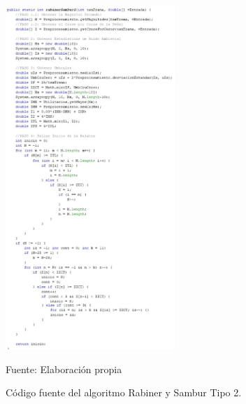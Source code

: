 \begin{enumerate}
\begin{figure}[H]
\captionsetup{justification=centering}
\begin{center}
\includegraphics[width=0.57\textwidth]{Imagenes/Cap3/image018}
\end{center}
\begin{center}
\vskip -0.5cm
\caption{\small{Código fuente del algoritmo Rabiner y Sambur Tipo 2.}}
\label{fig:figura3.18}
{\small{Fuente: Elaboración propia}}
\end{center}
\end{figure}


\end{enumerate}
